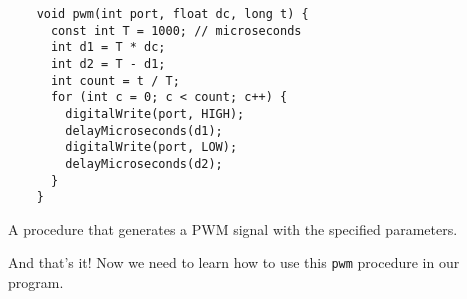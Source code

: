\documentclass[../sparc.tex]{subfiles}
\begin{document}
\begin{listing}[H]
  \begin{verbatim}
    void pwm(int port, float dc, long t) {
      const int T = 1000; // microseconds
      int d1 = T * dc;
      int d2 = T - d1;
      int count = t / T;
      for (int c = 0; c < count; c++) {
        digitalWrite(port, HIGH);
        delayMicroseconds(d1);
        digitalWrite(port, LOW);
        delayMicroseconds(d2);
      }
    }
  \end{verbatim}
  \label{listing:pwm-procedure}
  \caption{A procedure that generates a PWM signal with the specified
    parameters.}
\end{listing}

And that's it!  Now we need to learn how to use this \texttt{pwm} procedure in
our program.
\end{document}
